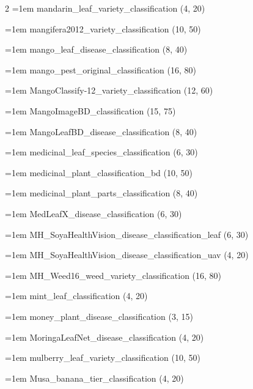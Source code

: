 \begin{multicols}{2}
\hangindent=1em mandarin\_\allowbreak{}leaf\_\allowbreak{}variety\_\allowbreak{}classification (4, 20)\par
\hangindent=1em mangifera2012\_\allowbreak{}variety\_\allowbreak{}classification (10, 50)\par
\hangindent=1em mango\_\allowbreak{}leaf\_\allowbreak{}disease\_\allowbreak{}classification (8, 40)\par
\hangindent=1em mango\_\allowbreak{}pest\_\allowbreak{}original\_\allowbreak{}classification (16, 80)\par
\hangindent=1em MangoClassify-12\_\allowbreak{}variety\_\allowbreak{}classification (12, 60)\par
\hangindent=1em MangoImageBD\_\allowbreak{}classification (15, 75)\par
\hangindent=1em MangoLeafBD\_\allowbreak{}disease\_\allowbreak{}classification (8, 40)\par
\hangindent=1em medicinal\_\allowbreak{}leaf\_\allowbreak{}species\_\allowbreak{}classification (6, 30)\par
\hangindent=1em medicinal\_\allowbreak{}plant\_\allowbreak{}classification\_\allowbreak{}bd (10, 50)\par
\hangindent=1em medicinal\_\allowbreak{}plant\_\allowbreak{}parts\_\allowbreak{}classification (8, 40)\par
\hangindent=1em MedLeafX\_\allowbreak{}disease\_\allowbreak{}classification (6, 30)\par
\hangindent=1em MH\_\allowbreak{}SoyaHealthVision\_\allowbreak{}disease\_\allowbreak{}classification\_\allowbreak{}leaf (6, 30)\par
\hangindent=1em MH\_\allowbreak{}SoyaHealthVision\_\allowbreak{}disease\_\allowbreak{}classification\_\allowbreak{}uav (4, 20)\par
\hangindent=1em MH\_\allowbreak{}Weed16\_\allowbreak{}weed\_\allowbreak{}variety\_\allowbreak{}classification (16, 80)\par
\hangindent=1em mint\_\allowbreak{}leaf\_\allowbreak{}classification (4, 20)\par
\hangindent=1em money\_\allowbreak{}plant\_\allowbreak{}disease\_\allowbreak{}classification (3, 15)\par
\hangindent=1em MoringaLeafNet\_\allowbreak{}disease\_\allowbreak{}classification (4, 20)\par
\hangindent=1em mulberry\_\allowbreak{}leaf\_\allowbreak{}variety\_\allowbreak{}classification (10, 50)\par
\hangindent=1em Musa\_\allowbreak{}banana\_\allowbreak{}tier\_\allowbreak{}classification (4, 20)\par

\end{multicols}

